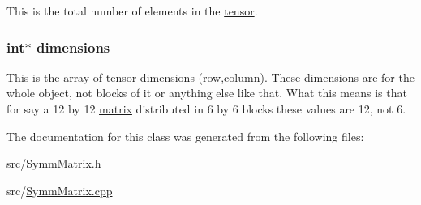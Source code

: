This is the total number of elements in the \hyperlink{classJKBuilder_1_1tensor}{tensor}. \hypertarget{classJKBuilder_1_1tensor_a2ce1e6e0782ddee097f2c4aa2663d3e9}{
\subsubsection[{dimensions}]{\setlength{\rightskip}{0pt plus 5cm}int$\ast$ {\bf dimensions}}}
\label{classJKBuilder_1_1tensor_a2ce1e6e0782ddee097f2c4aa2663d3e9}


This is the array of \hyperlink{classJKBuilder_1_1tensor}{tensor} dimensions (row,column). These dimensions are for the whole object, not blocks of it or anything else like that. What this means is that for say a 12 by 12 \hyperlink{classJKBuilder_1_1matrix}{matrix} distributed in 6 by 6 blocks these values are 12, not 6. 

The documentation for this class was generated from the following files:\begin{DoxyCompactItemize}
\item 
src/\hyperlink{SymmMatrix_8h}{SymmMatrix.h}\item 
src/\hyperlink{SymmMatrix_8cpp}{SymmMatrix.cpp}\end{DoxyCompactItemize}
